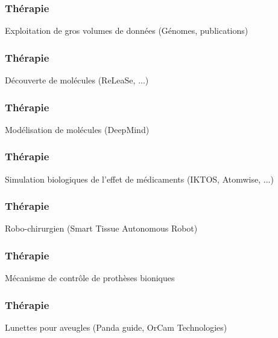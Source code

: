 \begin{frame}
  \frametitle{Thérapie}
  Exploitation de gros volumes de données (Génomes, publications)
  \newline
  \newline
  \begin{minipage}[c]{0.49\linewidth}
  \end{minipage}\hfill
  \begin{minipage}[c]{0.49\linewidth}
  \end{minipage}\hfill
\end{frame}


\begin{frame}
  \frametitle{Thérapie}
  Découverte de molécules (ReLeaSe, ...) 
\end{frame}

\begin{frame}
  \frametitle{Thérapie}
  Modélisation de molécules (DeepMind)
\end{frame}

\begin{frame}
  \frametitle{Thérapie}
  \begin{minipage}[c]{0.49\linewidth}
    Simulation biologiques de l'effet de médicaments (IKTOS, Atomwise, ...)
  \end{minipage}\hfill
  \begin{minipage}[c]{0.49\linewidth}
  \end{minipage}\hfill
\end{frame}

\begin{frame}
  \frametitle{Thérapie}
  Robo-chirurgien (Smart Tissue Autonomous Robot)
\end{frame}

\begin{frame}
  \frametitle{Thérapie}
  Mécanisme de contrôle de prothèses bioniques
\end{frame}

\begin{frame}
  \frametitle{Thérapie}
  Lunettes pour aveugles (Panda guide, OrCam Technologies)
\end{frame}
